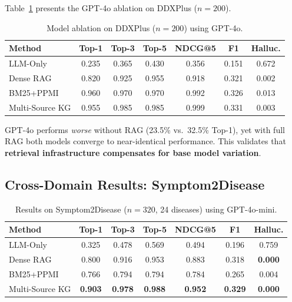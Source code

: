 \documentclass[runningheads]{llncs}
\begin{document}
Table~\ref{tab:gpt4o} presents the GPT-4o ablation on DDXPlus ($n{=}200$).

\begin{table}[t]
\centering
\caption{Model ablation on DDXPlus ($n{=}200$) using GPT-4o.}
\label{tab:gpt4o}
\begin{tabular}{lcccccc}
\toprule
\textbf{Method} & \textbf{Top-1} & \textbf{Top-3} & \textbf{Top-5} & \textbf{NDCG@5} & \textbf{F1} & \textbf{Halluc.} \\
\midrule
LLM-Only       & 0.235 & 0.365 & 0.430 & 0.356 & 0.151 & 0.672 \\
Dense RAG       & 0.820 & 0.925 & 0.955 & 0.918 & 0.321 & 0.002 \\
BM25+PPMI       & 0.960 & 0.970 & 0.970 & 0.992 & 0.326 & 0.013 \\
Multi-Source KG & 0.955 & 0.985 & 0.985 & 0.999 & 0.331 & 0.003 \\
\bottomrule
\end{tabular}
\end{table}

GPT-4o performs \emph{worse} without RAG (23.5\% vs.\ 32.5\% Top-1), yet with full RAG both models converge to near-identical performance. This validates that \textbf{retrieval infrastructure compensates for base model variation}.

\subsection{Cross-Domain Results: Symptom2Disease}
\label{sec:cross_domain}

\begin{table}[t]
\centering
\caption{Results on Symptom2Disease ($n{=}320$, 24 diseases) using GPT-4o-mini.}
\label{tab:s2d}
\begin{tabular}{lcccccc}
\toprule
\textbf{Method} & \textbf{Top-1} & \textbf{Top-3} & \textbf{Top-5} & \textbf{NDCG@5} & \textbf{F1} & \textbf{Halluc.} \\
\midrule
LLM-Only       & 0.325 & 0.478 & 0.569 & 0.494 & 0.196 & 0.759 \\
Dense RAG       & 0.800 & 0.916 & 0.953 & 0.883 & 0.318 & \textbf{0.000} \\
BM25+PPMI       & 0.766 & 0.794 & 0.794 & 0.784 & 0.265 & 0.004 \\
Multi-Source KG & \textbf{0.903} & \textbf{0.978} & \textbf{0.988} & \textbf{0.952} & \textbf{0.329} & \textbf{0.000} \\
\bottomrule
\end{tabular}
\end{table}
\end{document}

